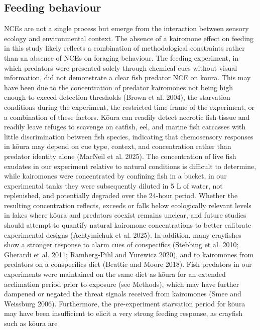 \documentclass[
  12pt,
  a4paper,
  oneside]{scrbook}
\begin{document}
\subsection{Feeding behaviour}\label{feeding-behaviour}

NCEs are not a single process but emerge from the interaction between
sensory ecology and environmental context. The absence of a kairomone
effect on feeding in this study likely reflects a combination of
methodological constraints rather than an absence of NCEs on foraging
behaviour. The feeding experiment, in which predators were presented
solely through chemical cues without visual information, did not
demonstrate a clear fish predator NCE on kōura. This may have been due
to the concentration of predator kairomones not being high enough to
exceed detection thresholds (Brown et al. 2004), the starvation
conditions during the experiment, the restricted time frame of the
experiment, or a combination of these factors. Kōura can readily detect
necrotic fish tissue and readily leave refuges to scavenge on catfish,
eel, and marine fish carcasses with little discrimination between fish
species, indicating that chemosensory responses in kōura may depend on
cue type, context, and concentration rather than predator identity alone
(MacNeil et al. 2025). The concentration of live fish exudates in our
experiment relative to natural conditions is difficult to determine,
while kairomones were concentrated by confining fish in a bucket, in our
experimental tanks they were subsequently diluted in 5 L of water, not
replenished, and potentially degraded over the 24-hour period. Whether
the resulting concentration reflects, exceeds or falls below
ecologically relevant levels in lakes where kōura and predators coexist
remains unclear, and future studies should attempt to quantify natural
kairomone concentrations to better calibrate experimental designs
(Achtymichuk et al. 2025). In addition, many crayfishes show a stronger
response to alarm cues of conspecifics (Stebbing et al. 2010; Gherardi
et al. 2011; Ramberg-Pihl and Yurewicz 2020), and to kairomones from
predators on a conspecifics diet (Beattie and Moore 2018). Fish
predators in our experiments were maintained on the same diet as kōura
for an extended acclimation period prior to exposure (see Methods),
which may have further dampened or negated the threat signals received
from kairomones (Smee and Weissburg 2006). Furthermore, the
pre-experiment starvation period for kōura may have been insufficient to
elicit a very strong feeding response, as crayfish such as kōura are
\end{document}
